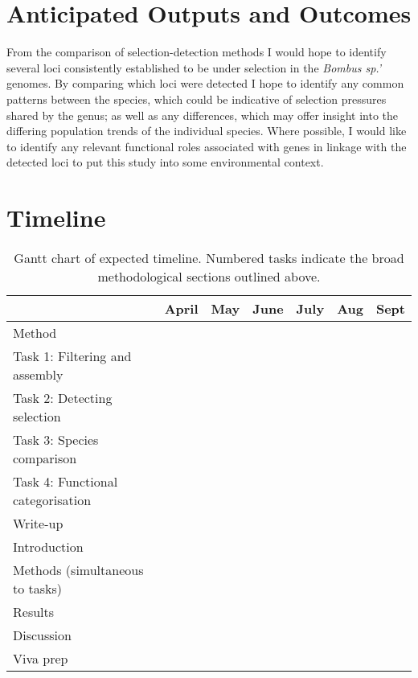 \documentclass[11pt]{article}
\begin{document}
\begin{linenumbers}
    
    \section{Anticipated Outputs and Outcomes}
    
    From the comparison of selection-detection methods I would hope to identify several loci consistently established to be under selection in the \emph{Bombus sp.'} genomes. By comparing which loci were detected I hope to identify any common patterns between the species, which could be indicative of selection pressures shared by the genus; as well as any differences, which may offer insight into the differing population trends of the individual species. Where possible, I would like to identify any relevant functional roles associated with genes in linkage with the detected loci to put this study into some environmental context.

    \section{Timeline}

    \begin{table}[ht!]
        \caption{Gantt chart of expected timeline. Numbered tasks indicate the broad methodological sections outlined above.}
        \begin{center}
        \begin{tabular}{l||c|c|c|c|c|c}
             & April & May & June & July & Aug & Sept\\
            \hline
            \hline
            Method  \\
            \hline
            \hline
            Task 1: Filtering and assembly & \cellcolor{gray} & & & & & \\
            \hline
            Task 2: Detecting selection & & \cellcolor{gray} & \cellcolor{gray} & & & \\
            \hline
            Task 3: Species comparison & & & \cellcolor{gray} & & & \\
            \hline
            Task 4: Functional categorisation & & & & \cellcolor{gray} & \cellcolor{gray} & \\
            \hline
            \hline
            Write-up \\
            \hline
            \hline
            Introduction & \cellcolor{gray} & & & & & \\
            \hline
            Methods (simultaneous to tasks) & \cellcolor{gray} & \cellcolor{gray} & \cellcolor{gray} & \cellcolor{gray} & & \\
            \hline
            Results & & & \cellcolor{gray} & \cellcolor{gray} & \cellcolor{gray} & \\
            \hline
            Discussion & & & & \cellcolor{gray} & \cellcolor{gray} & \cellcolor{gray} \\
            \hline
            \hline
            Viva prep & & & & & & \cellcolor{gray} \\


\end{tabular}
\end{center}
\end{table}
\end{linenumbers}
\end{document}
